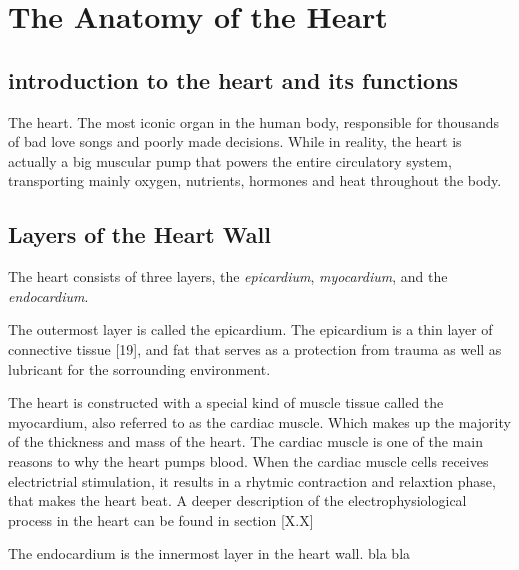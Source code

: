 \chapter{The Anatomy of the Heart}

\section{introduction to the heart and its functions}
The heart. The most iconic organ in the human body, responsible for thousands of bad love songs and poorly made decisions. While in reality, the heart is actually a big muscular pump that powers the entire circulatory system, transporting mainly oxygen, nutrients, hormones and heat throughout the body. 

\section{Layers of the Heart Wall}
The heart consists of three layers, the \textit{epicardium}, \textit{myocardium}, and the \textit{endocardium}. 

The outermost layer is called the epicardium. The epicardium is a thin layer of connective tissue [19], and fat that serves as a protection from trauma as well as lubricant for the sorrounding environment. 

The heart is constructed with a special kind of muscle tissue called the myocardium, also referred to as the cardiac muscle. Which makes up the majority of the thickness and mass of the heart. The cardiac muscle is one of the main reasons to why the heart pumps blood. When the cardiac muscle cells receives electrictrial stimulation, it results in a rhytmic contraction and relaxtion phase, that makes the heart beat. A deeper description of the electrophysiological process in the heart can be found in section [X.X]

The endocardium is the innermost layer in the heart wall. bla bla


